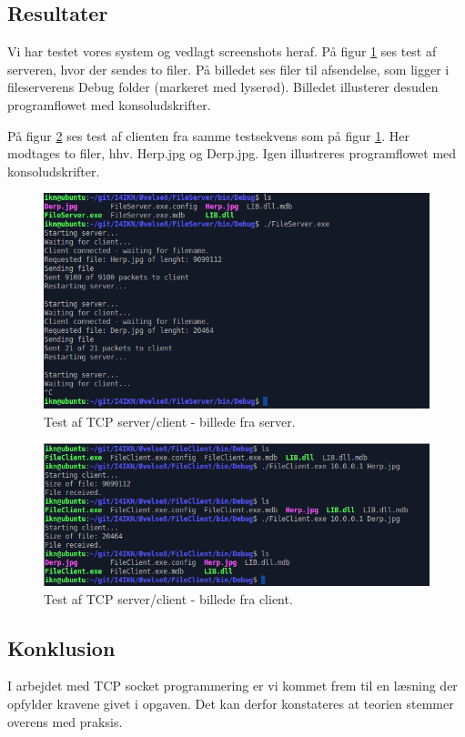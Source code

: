 \subsection{Resultater}
Vi har testet vores system og vedlagt screenshots heraf. På figur \ref{fig:tcp_h1} ses test af serveren, hvor der sendes to filer. På billedet ses filer til afsendelse, som ligger i fileserverens Debug folder (markeret med lyserød). Billedet illusterer desuden programflowet med konsoludskrifter.

På figur \ref{fig:tcp_h2} ses test af clienten fra samme testsekvens som på figur \ref{fig:tcp_h1}. Her modtages to filer, hhv. Herp.jpg og Derp.jpg. Igen illustreres programflowet med konsoludskrifter. 

\begin{figure}[H]
	\centering
	\includegraphics[width=0.9\linewidth]{figs/tcp_h1}
	\caption{Test af TCP server/client - billede fra server.}
	\label{fig:tcp_h1}
\end{figure}

\begin{figure}[H]
	\centering
	\includegraphics[width=0.9\linewidth]{figs/tcp_h2}
	\caption{Test af TCP server/client - billede fra client.}
	\label{fig:tcp_h2}
\end{figure}

\subsection{Konklusion}
I arbejdet med TCP socket programmering er vi kommet frem til en læsning der opfylder kravene givet i opgaven. Det kan derfor konstateres at teorien stemmer overens med praksis.